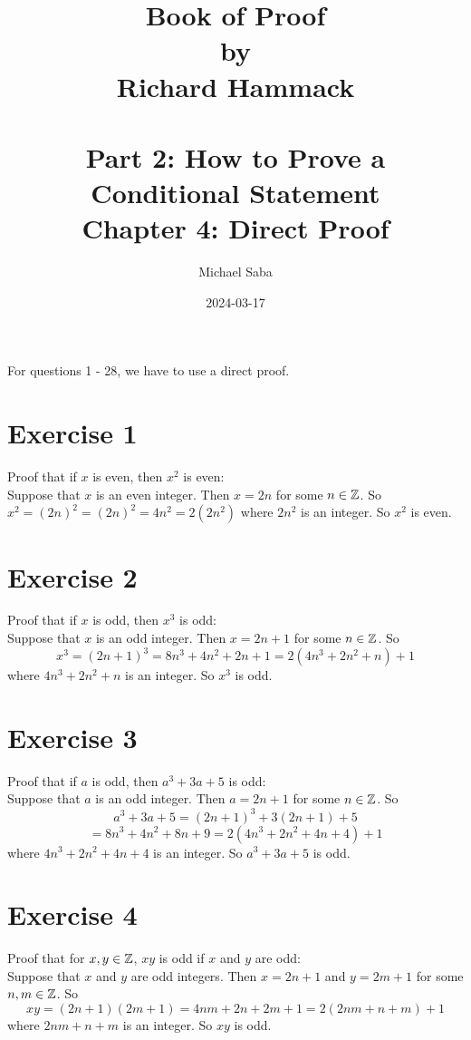 \documentclass[12pt]{article}
\title{%
    \Huge Book of Proof \\
    \large by \\
    \Large Richard Hammack \\~\\
    \huge Part 2: How to Prove a Conditional Statement \\
    \LARGE Chapter 4: Direct Proof
}
\date{2024-03-17}
\author{Michael Saba}
\begin{document}
    \maketitle
    \newpage
    \setlength{\parindent}{0pt}

    For questions 1 - 28, we have to use a direct proof. \\

    \section*{Exercise 1}
    Proof that if $x$ is even,
    then $x^2$ is even: \\
    Suppose that $x$ is an even integer.
    Then $x = 2n$ for some $n \in \mathbb{Z}$.
    So $x^2 = (2n)^2 = (2n)^2 = 4n^2 = 2(2n^2)$
    where $2n^2$ is an integer.
    So $x^2$ is even.

    \section*{Exercise 2}
    Proof that if $x$ is odd,
    then $x^3$ is odd: \\
    Suppose that $x$ is an odd integer.
    Then $x = 2n+1$ for some $n \in \mathbb{Z}$.
    So
    \[ x^3 = (2n+1)^3 = 8n^3 + 4n^2 + 2n + 1 = 2(4n^3 + 2n^2 + n) + 1 \]
    where $4n^3 + 2n^2 + n$ is an integer.
    So $x^3$ is odd. \\

    \section*{Exercise 3}
    Proof that if $a$ is odd,
    then $a^3 + 3a + 5$ is odd: \\
    Suppose that $a$ is an odd integer.
    Then $a = 2n+1$ for some $n \in \mathbb{Z}$.
    So 
    \[ a^3 + 3a + 5 = (2n+1)^3 + 3(2n+1) + 5 \]
    \[ = 8n^3 + 4n^2 + 8n + 9 = 2(4n^3 + 2n^2 + 4n + 4) + 1 \]
    where $4n^3 + 2n^2 + 4n + 4$ is an integer.
    So $a^3 + 3a + 5$ is odd. \\

    \section*{Exercise 4}
    Proof that for $x, y \in \mathbb{Z}$,
    $xy$ is odd if $x$ and $y$ are odd: \\
    Suppose that $x$ and $y$ are odd integers.
    Then $x = 2n+1$ and $y = 2m+1$ for some $n, m \in \mathbb{Z}$.
    So 
    \[ xy = (2n+1)(2m+1) = 4nm + 2n + 2m + 1 = 2(2nm + n + m) + 1\]
    where $2nm + n + m$ is an integer.
    So $xy$ is odd. \\
\end{document}
